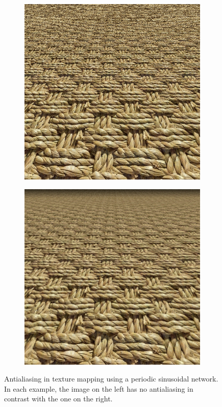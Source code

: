 \begin{figure}[!h]
    \centering
      \begin{subfigure}{0.40\textwidth}
        \includegraphics[width=\linewidth]{img/ch6/alias2.png}
        \caption{}
      \end{subfigure}
      \begin{subfigure}{0.40\textwidth}
        \includegraphics[width=\linewidth]{img/ch6/anti_alias2.png}
        \caption{}
      \end{subfigure}
      \caption{Antialiasing in texture mapping using a periodic sinusoidal network. In each example, the image on the left has no antialiasing in contrast with the one on the right.}
    \label{f:alias}
\end{figure}


